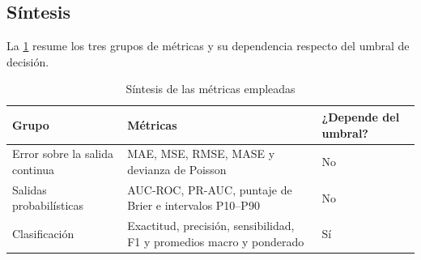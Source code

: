 \subsection{Síntesis}

La \cref{tab:sintesis-metricas} resume los tres grupos de métricas y su dependencia respecto del umbral de decisión.

\begin{table}[htbp]
\centering
\caption{Síntesis de las métricas empleadas}
\label{tab:sintesis-metricas}
\begin{tabularx}{\linewidth}{@{}lXl@{}}
\toprule
\textbf{Grupo} & \textbf{Métricas} & \textbf{¿Depende del umbral?} \\
\midrule
Error sobre la salida continua & MAE, MSE, RMSE, MASE y devianza de Poisson & No \\
Salidas probabilísticas & AUC-ROC, PR-AUC, puntaje de Brier e intervalos P10--P90 & No \\
Clasificación & Exactitud, precisión, sensibilidad, F1 y promedios macro y ponderado & Sí \\
\bottomrule
\end{tabularx}
\end{table}

